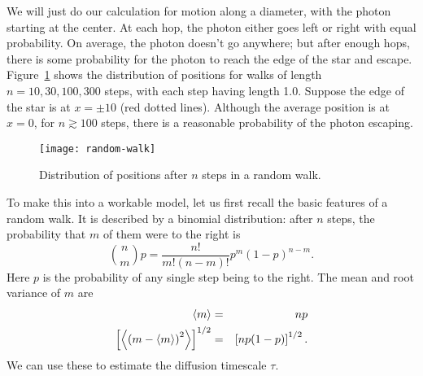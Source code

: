 We will just do our calculation for motion along a diameter, with the photon starting at the center. At each hop, the photon either goes left or right with equal probability. On average, the photon doesn't go anywhere; but after enough hops, there is some probability for the photon to reach the edge of the star and escape. Figure~\ref{f.random-walk} shows the distribution of positions for walks of length $n = 10, 30, 100, 300$ steps, with each step having length 1.0. Suppose the edge of the star is at $x=\pm 10$ (red dotted lines).  Although the average position is at $x=0$, for $n \gtrsim 100$ steps, there is a reasonable probability of the photon escaping.
\begin{figure}[htbp]
\forceversofloat
\texttt{[image: random-walk]}
\caption{\label{f.random-walk} Distribution of positions after $n$ steps in a random walk.}
\end{figure}

To make this into a workable model, let us first recall the basic features of a random walk. It is described by a binomial distribution: after $n$ steps, the probability that $m$ of them were to the right is
\begin{equation}\label{e.binomial}
    \binom{n}{m}{p} = \frac{n!}{m!(n-m)!} p^{m}(1-p)^{n-m}.
\end{equation}
Here $p$ is the probability of any single step being to the right.
The mean and root variance of $m$ are
\begin{eqnarray}
	\left\langle m\right\rangle &=& np \label{e.mean-binomial} \\
	\left[\left\langle\left(m-\left\langle m\right\rangle\right)^{2}\right\rangle\right]^{1/2} &=& \left[np(1-p)\right]^{1/2}. \label{e.var-binomial}
\end{eqnarray}
We can use these to estimate the diffusion timescale $\tau$.

